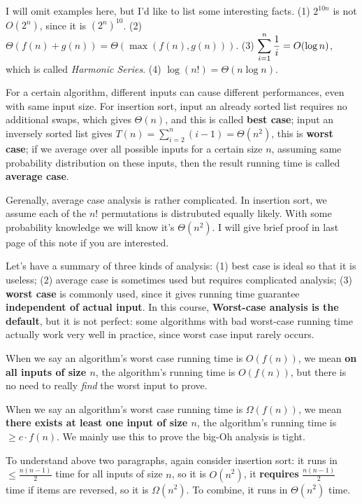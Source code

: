 \documentclass[11pt, a4paper]{COMP3711}
\begin{document}
\begin{spacing}{1.5}
    I will omit examples here, but I'd like to list some interesting facts.
    (1) $2^{10n}$ is not $O(2^n)$, since it is $(2^n)^{10}$. 
    (2) $\Theta (f(n)+g(n))=\Theta(\max(f(n), g(n)))$.
    (3) $\displaystyle \sum_{i=1}^{n}\frac{1}{i}=O(\log n)$, which is 
    called {\it Harmonic Series}.
    (4) $\log(n!)=\Theta (n\log n)$.

    For a certain algorithm, different inputs can cause different
    performances, even with same input size.
    For insertion sort, input an already sorted list requires
    no additional swaps, which gives $\Theta(n)$, and this is 
    called {\bf best case}; input an inversely sorted list
    gives $T(n)=\sum_{i=2}^{n}(i-1)=\Theta(n^2)$, this is 
    {\bf worst case}; if we average over all possible inputs
    for a certain size $n$, assuming same probability distribution
    on these inputs, then the result running time is called 
    {\bf average case}.

    Gerenally, average case analysis is rather complicated.
    In insertion sort, we assume each of the $n!$ permutations
    is distrubuted equally likely. With some probability 
    knowledge we will know it's $\Theta(n^2)$. I will 
    give brief proof in last page of this note if you are interested.

    Let's have a summary of three kinds of analysis: 
    (1) best case is ideal so that it is useless;
    (2) average case is sometimes used but requires
    complicated analysis; 
    (3) {\bf worst case} is commonly used, since it gives 
    running time guarantee {\bf independent of actual input}.
    In this course, {\bf Worst-case analysis is the default},
    but it is not perfect: some algorithms with bad worst-case 
    running time actually work very well in practice, 
    since worst case input rarely occurs.

    When we say an algorithm’s worst case running time is $O(f(n))$,
    we mean {\bf on all inputs of size $n$}, the algorithm’s 
    running time is $O(f(n))$, but there is no need to really 
    {\it find} the worst input to prove.

    When we say an algorithm’s worst case running time is $\Omega(f(n))$,
    we mean {\bf there exists at least one input of size $n$}, the algorithm’s 
    running time is $\ge c\cdot f(n)$. We mainly use this to prove 
    the big-Oh analysis is tight.

    To understand above two paragraphs, again consider insertion
    sort: it runs in $\le \frac{n(n-1)}{2}$ time for all inputs 
    of size $n$, so it is $O(n^2)$, it {\bf requires} 
    $\frac{n(n-1)}{2}$ time if items are reversed, 
    so it is $\Omega(n^2)$. To combine, it runs in $\Theta(n^2)$ time.


\end{spacing}
\end{document}
